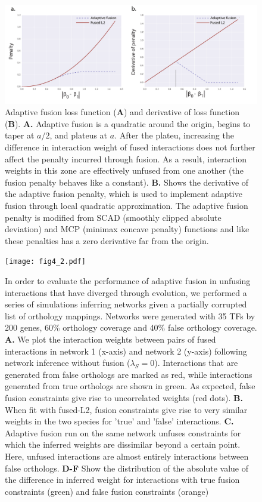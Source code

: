 \documentclass[11pt]{article}
\begin{document}
\begin{figure}
\begin{center}
  \includegraphics[scale=0.45]{fig3.pdf}
  \caption{\label{adapt-schematic} Adaptive fusion loss function (\textbf{A}) and derivative of loss function (\textbf{B}). 
  \textbf{A.} Adaptive fusion is a quadratic around the origin, begins to taper at $a/2$, and plateus at $a$. After the plateu, increasing the difference in interaction weight of fused interactions does not further affect the penalty incurred through fusion. As a result, interaction weights in this zone are effectively unfused from one another (the fusion penalty behaves like a constant). 
  \textbf{B.} Shows the derivative of the adaptive fusion penalty, which is used to implement adaptive fusion through local quadratic approximation. The adaptive fusion penalty is modified from SCAD (smoothly clipped absolute deviation) and MCP (minimax concave penalty) functions and like these penalties has a zero derivative far from the origin. }
\end{center}
\end{figure}
\pagebreak

\begin{figure}
\begin{center}
  \texttt{[image: fig4\_2.pdf]}
  \caption{\label{adaptivefusion} In order to evaluate the performance of adaptive fusion in unfusing interactions that have diverged through evolution, we performed a series of simulations inferring networks given a partially corrupted list of orthology mappings. 
  Networks were generated with 35 TFs by 200 genes, 60\% orthology coverage and 40\% false orthology coverage. \textbf{A.} We plot the interaction weights between pairs of fused interactions in network 1 (x-axis) and network 2 (y-axis) following network inference without fusion ($\lambda_S=0$). 
  Interactions that are generated from false orthologs are marked as red, while interactions generated from true orthologs are shown in green. 
  As expected, false fusion constraints give rise to uncorrelated weights (red dots). \textbf{B.} 
  When fit with fused-L2, fusion constraints give rise to very similar weights in the two species for 'true' and 'false' interactions. 
  \textbf{C.} Adaptive fusion run on the same network unfuses constraints for which the inferred weights are dissimilar beyond a certain point. 
  Here, unfused interactions are almost entirely interactions between false orthologs. \textbf{D-F} Show the distribution of the absolute value of the difference in inferred weight for interactions with true fusion constraints (green) and false fusion constraints (orange)}
\end{center}
\end{figure}
\end{document}
